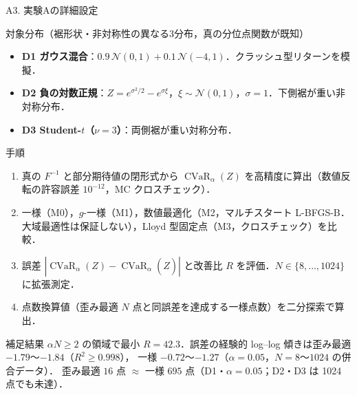 \documentclass[aspectratio=169, 10pt]{beamer}
\providecommand{\Finv}{}\renewcommand{\Finv}{F^{-1}}
\DeclareMathOperator{\CVaR}{CVaR}
\begin{document}
\begin{frame}{A3. 実験Aの詳細設定}
  \footnotesize
  \begin{block}{対象分布（裾形状・非対称性の異なる3分布，真の分位点関数が既知）}
    \begin{itemize}
      \item \textbf{D1 ガウス混合}：$0.9\,\mathcal N(0,1)+0.1\,\mathcal N(-4,1)$．クラッシュ型リターンを模擬．
      \item \textbf{D2 負の対数正規}：$Z=e^{\sigma^2/2}-e^{\sigma\xi}$，$\xi\sim\mathcal N(0,1)$，$\sigma=1$．下側裾が重い非対称分布．
      \item \textbf{D3 Student-$t$（$\nu=3$）}：両側裾が重い対称分布．
    \end{itemize}
  \end{block}
  \begin{block}{手順}
    \begin{enumerate}
      \item 真の $\Finv$ と部分期待値の閉形式から $\CVaR_\alpha(Z)$ を高精度に算出（数値反転の許容誤差 $10^{-12}$，MC クロスチェック）．
      \item 一様（M0），$g$-一様（M1），数値最適化（M2，マルチスタート L-BFGS-B．大域最適性は保証しない），Lloyd 型固定点（M3，クロスチェック）を比較．
      \item 誤差 $|\CVaR_\alpha(Z)-\CVaR_\alpha(\hat Z)|$ と改善比 $R$ を評価．$N\in\{8,\dots,1024\}$ に拡張測定．
      \item 点数換算値（歪み最適 $N$ 点と同誤差を達成する一様点数）を二分探索で算出．
    \end{enumerate}
  \end{block}
  \begin{exampleblock}{補足結果}
    $\alpha N\ge 2$ の領域で最小 $R=42.3$．誤差の経験的 log--log 傾きは歪み最適 $-1.79$〜$-1.84$（$R^2\ge0.998$），
    一様 $-0.72$〜$-1.27$（$\alpha=0.05$，$N=8$〜$1024$ の併合データ）．
    歪み最適 $16$ 点 $\approx$ 一様 $695$ 点（D1・$\alpha=0.05$；D2・D3 は 1024 点でも未達）．
  \end{exampleblock}
\end{frame}
\end{document}
